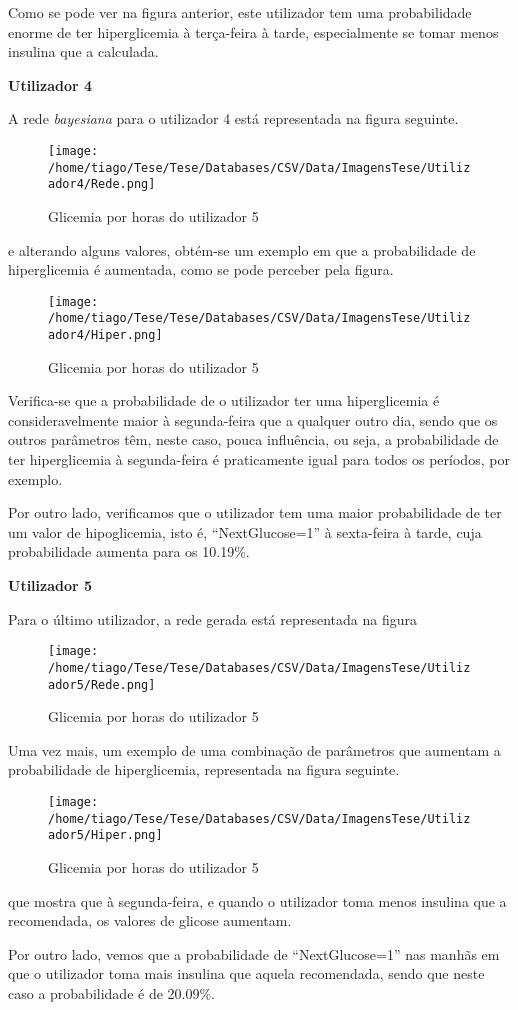 Como se pode ver na figura anterior, este utilizador tem uma probabilidade enorme de ter hiperglicemia à terça-feira à tarde, especialmente se tomar menos insulina que a calculada. 

\textbf{Utilizador 4}

A rede \textit{bayesiana} para o utilizador 4 está representada na figura seguinte.

\begin{figure}[H]
\centering
\texttt{[image: /home/tiago/Tese/Tese/Databases/CSV/Data/ImagensTese/Utilizador4/Rede.png]}
\caption{Glicemia por horas do utilizador 5}
\end{figure}

e alterando alguns valores, obtém-se um exemplo em que a probabilidade de hiperglicemia é aumentada, como se pode perceber pela figura.

\begin{figure}[H]
\centering
\texttt{[image: /home/tiago/Tese/Tese/Databases/CSV/Data/ImagensTese/Utilizador4/Hiper.png]}
\caption{Glicemia por horas do utilizador 5}
\end{figure}

Verifica-se que a probabilidade de o utilizador ter uma hiperglicemia é consideravelmente maior à segunda-feira que a qualquer outro dia, sendo que os outros parâmetros têm, neste caso, pouca influência, ou seja, a probabilidade de ter hiperglicemia à segunda-feira é praticamente igual para todos os períodos, por exemplo.

Por outro lado, verificamos que o utilizador tem uma maior probabilidade de ter um valor de hipoglicemia, isto é, ``Next\textunderscore Glucose=1'' à sexta-feira à tarde, cuja probabilidade aumenta para os 10.19\%.


\textbf{Utilizador 5}


Para o último utilizador, a rede gerada está representada na figura

\begin{figure}[H]
\centering
\texttt{[image: /home/tiago/Tese/Tese/Databases/CSV/Data/ImagensTese/Utilizador5/Rede.png]}
\caption{Glicemia por horas do utilizador 5}
\end{figure}

Uma vez mais, um exemplo de uma combinação de parâmetros que aumentam a probabilidade de hiperglicemia, representada na figura seguinte.

\begin{figure}[H]
\centering
\texttt{[image: /home/tiago/Tese/Tese/Databases/CSV/Data/ImagensTese/Utilizador5/Hiper.png]}
\caption{Glicemia por horas do utilizador 5}
\end{figure}

que mostra que à segunda-feira, e quando o utilizador toma menos insulina que a recomendada, os valores de glicose aumentam. 

Por outro lado, vemos que a probabilidade de ``Next\textunderscore Glucose=1'' nas manhãs em que o utilizador toma mais insulina que aquela recomendada, sendo que neste caso a probabilidade é de 20.09\%.



